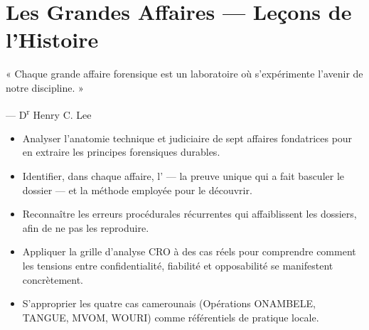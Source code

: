 %
%

\chapter{Les Grandes Affaires --- Leçons de l'Histoire}
\label{chap:gr-affaires}

\epigraph{%
    « Chaque grande affaire forensique est un laboratoire où s'expérimente
    l'avenir de notre discipline. »%
}{--- D\textsuperscript{r} Henry C. Lee}


\begin{boxobjectifs}
\begin{itemize}
    \item Analyser l'anatomie technique et judiciaire de sept affaires
          fondatrices pour en extraire les principes forensiques durables.
    \item Identifier, dans chaque affaire, l' ---
          la preuve unique qui a fait basculer le dossier --- et la méthode
          employée pour le découvrir.
    \item Reconnaître les erreurs procédurales récurrentes qui affaiblissent
          les dossiers, afin de ne pas les reproduire.
    \item Appliquer la grille d'analyse CRO à des cas réels pour comprendre
          comment les tensions entre confidentialité, fiabilité et opposabilité
          se manifestent concrètement.
    \item S'approprier les quatre cas camerounais (Opérations ONAMBELE, TANGUE,
          MVOM, WOURI) comme référentiels de pratique locale.
\end{itemize}
\end{boxobjectifs}

